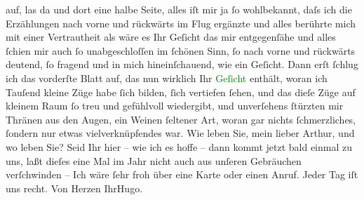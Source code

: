                auf, las da und dort eine halbe Seite, alles iſt mir ja ſo wohlbekannt, daſs ich die
               Erzählungen nach vorne und rückwärts im Flug ergänzte und alles berührte mich mit
               einer Vertrautheit als wäre es Ihr Geſicht das mir entgegenſähe und alles ſchien mir
               auch ſo unabgeschloſſen im ſchönen Sinn, ſo nach vorne und rückwärts deutend, ſo
               fragend und in mich hineinſchauend, wie ein Geſicht. Dann erſt ſchlug ich das
               vorderſte Blatt auf, das nun wirklich Ihr \textcolor{green}{Geſicht}{} enthält, woran ich Tauſend kleine Züge habe ſich
               bilden, ſich vertiefen ſehen, und das dieſe Züge auf kleinem Raum ſo treu und
               gefühlvoll wiedergibt, und unverſehens ſtürzten mir {\pb}Thränen aus den Augen, ein Weinen ſeltener Art, woran gar nichts ſchmerzliches,
               ſondern nur etwas vielverknüpfendes war.\pend
           \pstart
           Wie leben Sie, mein lieber Arthur, und wo leben Sie? Seid Ihr hier – wie ich es hoffe
               – dann kommt jetzt bald einmal zu uns, laßt dieſes eine Mal im Jahr nicht auch aus
               unſeren Gebräuchen verſchwinden – \pend
           \pstart
           Ich wäre ſehr froh über eine Karte oder einen Anruf. Jeder Tag iſt uns recht.\pend
           \pstart Von Herzen Ihr\spacefill\mbox{Hugo.}\pend{}\endnumbering{}  
      